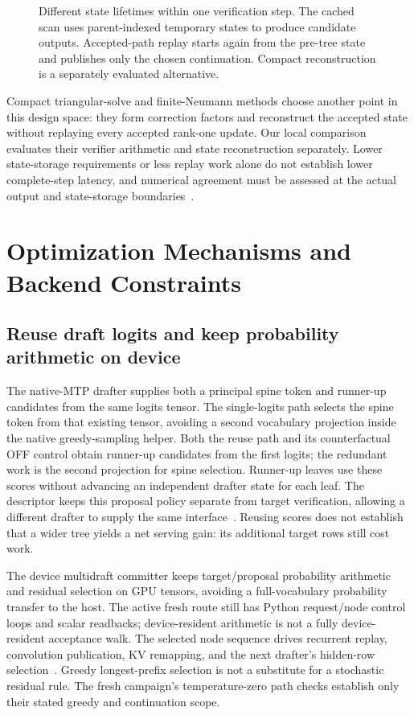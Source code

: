 \documentclass[conference]{IEEEtran}
\begin{document}
\begin{figure}[t]
\centering

\caption{Different state lifetimes within one verification step. The cached scan uses parent-indexed temporary states to produce candidate outputs. Accepted-path replay starts again from the pre-tree state and publishes only the chosen continuation. Compact reconstruction is a separately evaluated alternative.}
\label{fig:scan-replay}
\end{figure}

Compact triangular-solve and finite-Neumann methods choose another point in this design space: they form correction factors and reconstruct the accepted state without replaying every accepted rank-one update. Our local comparison evaluates their verifier arithmetic and state reconstruction separately. Lower state-storage requirements or less replay work alone do not establish lower complete-step latency, and numerical agreement must be assessed at the actual output and state-storage boundaries~\cite{ghantasala2026treewy,wang2026bole}.

\section{Optimization Mechanisms and Backend Constraints}
\label{sec:optimization}
\subsection{Reuse draft logits and keep probability arithmetic on device}
The native-MTP drafter supplies both a principal spine token and runner-up candidates from the same logits tensor. The single-logits path selects the spine token from that existing tensor, avoiding a second vocabulary projection inside the native greedy-sampling helper. Both the reuse path and its counterfactual OFF control obtain runner-up candidates from the first logits; the redundant work is the second projection for spine selection. Runner-up leaves use these scores without advancing an independent drafter state for each leaf. The descriptor keeps this proposal policy separate from target verification, allowing a different drafter to supply the same interface~\cite{lumo2026archive}. Reusing scores does not establish that a wider tree yields a net serving gain: its additional target rows still cost work.

The device multidraft committer keeps target/proposal probability arithmetic and residual selection on GPU tensors, avoiding a full-vocabulary probability transfer to the host. The active fresh route still has Python request/node control loops and scalar readbacks; device-resident arithmetic is not a fully device-resident acceptance walk. The selected node sequence drives recurrent replay, convolution publication, KV remapping, and the next drafter's hidden-row selection~\cite{lumo2026archive}. Greedy longest-prefix selection is not a substitute for a stochastic residual rule. The fresh campaign's temperature-zero path checks establish only their stated greedy and continuation scope.
\end{document}
